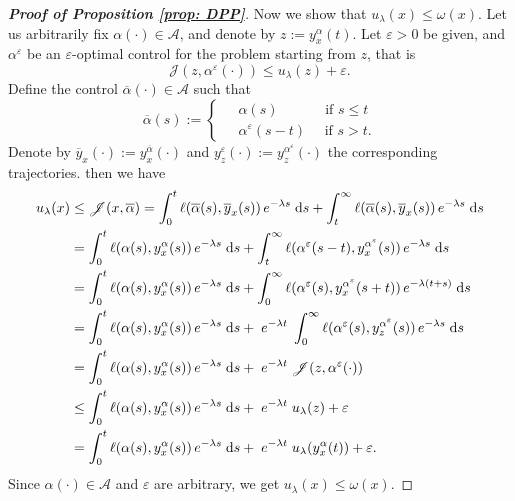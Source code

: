 \documentclass[12pt]{amsart}
\newcommand{\D}[1]{\mbox{\rm #1}}
\newcommand{\dd}{\D{d}}
\numberwithin{equation}{section}
\theoremstyle{plain}
\begin{document}
\begin{proof}[\textbf{Proof of Proposition \ref{prop: DPP}}]
Now we show that $u_{\lambda}(x) \leq \omega(x)$. 
Let us arbitrarily fix $\alpha(\cdot)\in \mathcal{A}$, and denote by $z := y_{x}^{\alpha}(t)$. Let $\varepsilon>0$ be given, and $\alpha^{\varepsilon}$ be an $\varepsilon$-optimal control for the problem starting from $z$, that is
\begin{equation*}
    \mathscr{J}(z, \alpha^{\varepsilon}(\cdot)) \leq u_{\lambda}(z) + \varepsilon.
\end{equation*}
Define the control $\overline{\alpha}(\cdot) \in \mathcal{A}$ such that
\begin{equation*}
\overline{\alpha}(s) := \left\{ \;
\begin{aligned}
    & \alpha(s) \quad \quad \quad \text{ if } s\leq t\\
    & \alpha^{\varepsilon}(s-t) \quad \text{ if } s>t.
\end{aligned}
\right.
\end{equation*}
Denote by $\overline{y}_{x}(\cdot):= y_{x}^{\overline{\alpha}}(\cdot)$ and $y_{z}^{\varepsilon}(\cdot) := y_{z}^{\alpha^{\varepsilon}}(\cdot)$ the corresponding trajectories. then we have
\begingroup\allowdisplaybreaks
\begin{align*}
    u_{\lambda}(x) 
    & \leq \mathscr{J}(x,\overline{\alpha}) = \int_{0}^{t} \ell(\overline{\alpha}(s), \overline{y}_{x}(s))\, e^{-\lambda s}\;\dd s + \int_{t}^{\infty} \ell(\overline{\alpha}(s), \overline{y}_{x}(s))\, e^{-\lambda s}\;\dd s\\
    & = \int_{0}^{t} \ell(\alpha(s), y_{x}^{\alpha}(s))\, e^{-\lambda s}\;\dd s + \int_{t}^{\infty} \ell(\alpha^{\varepsilon}(s-t), y_{x}^{\alpha^{\varepsilon}}(s))\, e^{-\lambda s}\;\dd s\\
    & =  \int_{0}^{t} \ell(\alpha(s), y^{\alpha}_{x}(s))\, e^{-\lambda s}\;\dd s + \int_{0}^{\infty} \ell(\alpha^{\varepsilon}(s), y_{x}^{\alpha^{\varepsilon}}(s+t))\, e^{-\lambda (t+s)}\;\dd s\\
    & =  \int_{0}^{t} \ell(\alpha(s), y^{\alpha}_{x}(s))\, e^{-\lambda s}\;\dd s + \; e^{-\lambda t}\;\int_{0}^{\infty} \ell(\alpha^{\varepsilon}(s), y_{z}^{\alpha^{\varepsilon}}(s))\, e^{-\lambda s}\;\dd s\\
    & =   \int_{0}^{t} \ell(\alpha(s), y^{\alpha}_{x}(s))\, e^{-\lambda s}\;\dd s +  \; e^{-\lambda t}\;\mathscr{J}(z,\alpha^{\varepsilon}(\cdot))\\
    & \leq  \int_{0}^{t} \ell(\alpha(s), y^{\alpha}_{x}(s))\, e^{-\lambda s}\;\dd s +  \; e^{-\lambda t}\;u_{\lambda}(z) + \varepsilon\\
    & = \int_{0}^{t} \ell(\alpha(s), y^{\alpha}_{x}(s))\, e^{-\lambda s}\;\dd s +  \; e^{-\lambda t}\;u_{\lambda}(y_{x}^{\alpha}(t)) + \varepsilon. 
\end{align*}
\endgroup
Since $\alpha(\cdot)\in \mathcal{A}$ and $\varepsilon$ are arbitrary, we get $u_{\lambda}(x)\leq \omega(x)$.
\end{proof}
\end{document}

